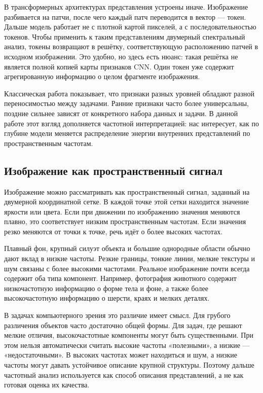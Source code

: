В трансформерных архитектурах представления устроены иначе. Изображение разбивается на патчи, после чего каждый патч переводится в вектор — токен. Дальше модель работает не с плотной картой пикселей, а с последовательностью токенов. Чтобы применить к таким представлениям двумерный спектральный анализ, токены возвращают в решётку, соответствующую расположению патчей в исходном изображении. Это удобно, но здесь есть нюанс: такая решётка не является полной копией карты признаков CNN. Один токен уже содержит агрегированную информацию о целом фрагменте изображения.

Классическая работа \cite{yosinski2014transferable} показывает, что признаки разных уровней обладают разной переносимостью между задачами. Ранние признаки часто более универсальны, поздние сильнее зависят от конкретного набора данных и задачи. В данной работе этот взгляд дополняется частотной интерпретацией: нас интересует, как по глубине модели меняется распределение энергии внутренних представлений по пространственным частотам.

\subsection{Изображение как пространственный сигнал}

Изображение можно рассматривать как пространственный сигнал, заданный на двумерной координатной сетке. В каждой точке этой сетки находится значение яркости или цвета. Если при движении по изображению значения меняются плавно, это соответствует низким пространственным частотам. Если значения резко меняются от точки к точке, речь идёт о более высоких частотах.

Плавный фон, крупный силуэт объекта и большие однородные области обычно дают вклад в низкие частоты. Резкие границы, тонкие линии, мелкие текстуры и шум связаны с более высокими частотами. Реальное изображение почти всегда содержит оба типа компонент. Например, фотография животного содержит низкочастотную информацию о форме тела и фоне, а также более высокочастотную информацию о шерсти, краях и мелких деталях.

В задачах компьютерного зрения это различие имеет смысл. Для грубого различения объектов часто достаточно общей формы. Для задач, где решают мелкие отличия, высокочастотные компоненты могут быть существенными. При этом нельзя автоматически считать высокие частоты «полезными», а низкие — «недостаточными». В высоких частотах может находиться и шум, а низкие частоты могут давать устойчивое описание крупной структуры. Поэтому дальше частотный анализ используется как способ описания представлений, а не как готовая оценка их качества.

